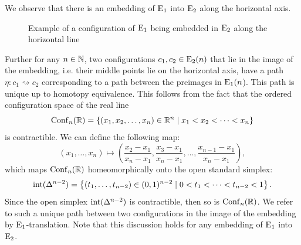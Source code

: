 \begin{rem}[$\E_1$ translation]\label{rem:e1-translation} We observe that
    there is an embedding of $\E_1$ into $\operatorname{E}_2$ along the horizontal axis.

    \begin{figure}[h!]
        \begin{center}
        \end{center}
        \caption{Example of a configuration of $\E_1$ being embedded in $\operatorname{E}_2$
        along the horizontal line}
    \end{figure}
    Further for any $n \in \mathbb{N}$, two configurations $c_1, c_2 \in \operatorname{E}_2(n)$ that
    lie in the image of the embedding, i.e. their middle points lie on the
    horizontal axis, have a path $\eta \colon c_1 \rightsquigarrow c_2$
    corresponding to a path between the preimages in $\operatorname{E}_1(n$). This path is
    unique up to homotopy equivalence. This follows from the fact that the
    ordered configuration space of the real line
    \[
        \operatorname{Conf}_n(\mathbb{R}) = \left\{ (x_1, x_2, \dots, x_n) \in \mathbb{R}^n \mid x_1 < x_2 < \dots < x_n \right\}
    \]
    is contractible. We can define the following map:
    \[
    (x_1, \dots, x_n) \mapsto \left( \frac{x_2 - x_1}{x_n - x_1}, \frac{x_3 - x_1}{x_n - x_1}, \dots, \frac{x_{n-1} - x_1}{x_n - x_1} \right),
    \]
    which maps $\operatorname{Conf}_n(\mathbb{R})$ homeomorphically onto the open standard simplex:
    \[
    \operatorname{int}(\Delta^{n-2}) = \left\{ (t_1, \dots, t_{n-2}) \in (0,1)^{n-2} \mid 0 < t_1 < \dots < t_{n-2} < 1 \right\}.
    \]
    Since the open simplex $\operatorname{int}(\Delta^{n-2})$ is contractible, then so is
    $\operatorname{Conf}_n(\mathbb{R})$.
    We refer to such a unique path between two configurations in the image of
    the embedding by $\E_1$-translation. Note that this discussion holds for any
    embedding of $\E_1$ into $\operatorname{E}_2$.
\end{rem}

